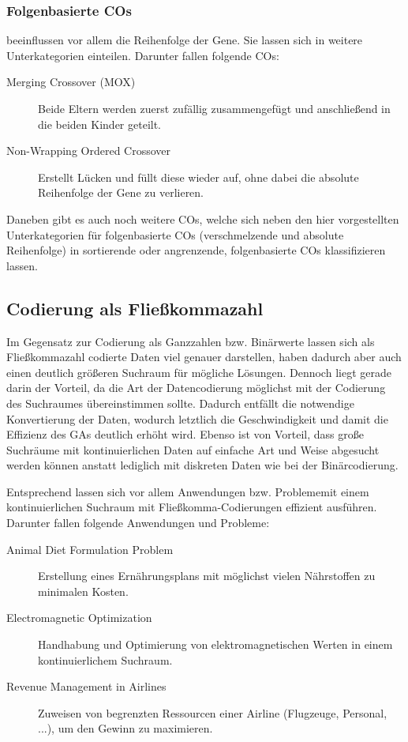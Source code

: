 	\subsubsection{Folgenbasierte COs}
	
		beeinflussen vor allem die Reihenfolge der Gene. Sie lassen sich in weitere Unterkategorien einteilen. Darunter fallen \zB folgende COs:
		
		\begin{description}
			\item[Merging Crossover (MOX)] Beide Eltern werden zuerst zufällig zu\-sam\-men\-ge\-fügt und anschließend in die beiden Kinder geteilt. \cite{OrderBasedForGCP}
			\item[Non-Wrapping Ordered Crossover] Erstellt Lücken und füllt diese wieder auf, ohne dabei die absolute Reihenfolge der Gene zu verlieren. \cite{GAforTSP}
		\end{description}
	
		Daneben gibt es auch noch weitere COs, welche sich neben den hier vorgestellten Unterkategorien für folgenbasierte COs (verschmelzende und absolute Reihenfolge) in \zB  sor\-tier\-ende oder angrenzende, folgenbasierte COs klassifizieren lassen.


\subsection{Codierung als Fließkommazahl}
\label{sec:FloatCod}

	Im Gegensatz zur Codierung als Ganzzahlen bzw. Binärwerte lassen sich  als Fließkommazahl codierte Daten viel genauer darstellen, haben da\-durch aber auch einen deutlich größeren Suchraum für mögliche Lösungen. Dennoch liegt gerade darin der Vorteil, da die Art der Datencodierung möglichst mit der Codierung des Suchraumes übereinstimmen sollte. Dadurch entfällt die not\-wen\-dige Konvertierung der Daten, wodurch letztlich die Geschwindigkeit und damit die Effizienz des GAs deutlich erhöht wird. Ebenso ist von Vorteil, dass große Suchräume mit kontinuierlichen Daten auf einfache Art und Weise abgesucht werden können anstatt lediglich mit diskreten Daten wie bei der Binärcodierung. \cite{TacklingRealCodedGA}
	
	Entsprechend lassen sich vor allem Anwendungen bzw. Problememit einem kontinuierlichen Suchraum mit Fließkomma-Codierungen effizient ausführen. Da\-run\-ter fallen \zB folgende Anwendungen und Probleme:
	
	\begin{description}
		\item[Animal Diet Formulation Problem] Erstellung eines Ernährungsplans mit möglichst vielen Nährstoffen zu minimalen Kosten. \cite{ConceptOfCOInRealCoded}
		\item[Electromagnetic Optimization] Handhabung und Optimierung von elektromagnetischen Werten in einem kontinuierlichem Suchraum. \cite{ElectromagneticRealEncoding}
		\item[Revenue Management in Airlines] Zuweisen von begrenzten Ressourcen ei\-ner Airline (Flugzeuge, Personal, ...), um den Gewinn zu maximieren. \cite{AirlineRevenueManagement}
	\end{description}
	
